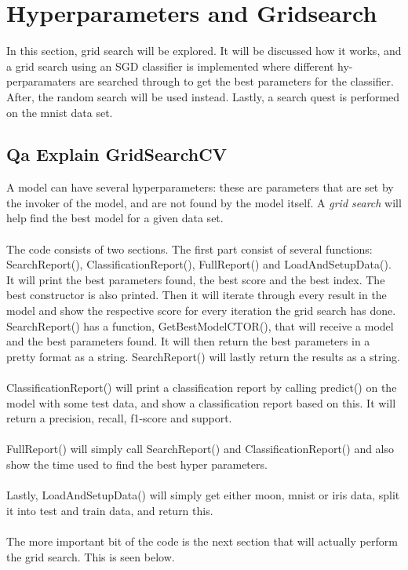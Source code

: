 \documentclass{article}
\begin{document}
\section{Hyperparameters and Gridsearch}
In this section, grid search will be explored. It will be discussed how it works, and a grid search using an SGD classifier is implemented where different hy-perparamaters are searched through to get the best parameters for the classifier. After, the random search will be used instead. Lastly, a search quest is performed on the mnist data set.

\subsection{Qa Explain GridSearchCV}
A model can have several hyperparameters: these are parameters that are set by the invoker of the model, and are not found by the model itself. A \textit{grid search} will help find the best model for a given data set.
\\ \\
The code consists of two sections. The first part consist of several functions: SearchReport(), ClassificationReport(), FullReport() and LoadAndSetupData(). It will print the best parameters found, the best score and the best index. The best constructor is also printed. Then it will iterate through every result in the model and show the respective score for every iteration the grid search has done. SearchReport() has a function, GetBestModelCTOR(), that will receive a model and the best parameters found. It will then return the best parameters in a pretty format as a string. SearchReport() will lastly return the results  as a string.
\\ \\
ClassificationReport() will print a classification report by  calling predict() on the model with some test data, and show a classification report based on this. It will return a precision, recall, f1-score and support.
\\ \\
FullReport() will simply call SearchReport() and ClassificationReport() and also show the time used to find the best hyper parameters.
\\ \\
Lastly, LoadAndSetupData() will simply get either moon, mnist or iris data, split it into test and train data, and return this.
\\ \\
The more important bit of the code is the next section that will actually perform the grid search. This is seen below.
\end{document}

